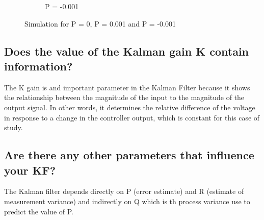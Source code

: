 \documentclass{article}
\begin{document}
\begin{figure}
\begin{subfigure} {.3\textwidth}
            \caption{P = -0.001}
        \end{subfigure}
        \caption{Simulation for P = 0, P =  0.001 and P = -0.001}
        \label{fig:simulation7}
    \end{figure}
    

    \subsection{Does the value of the Kalman gain K contain information?}

    The K gain is and important parameter in the Kalman Filter because it shows the relationship
    between the magnitude of the input to the magnitude of the output signal. In other words, it determines
    the relative difference of the voltage in response to a change in the controller output, which is constant 
    for this case of study.

    \subsection{Are there any other parameters that influence your KF?}

    The Kalman filter depends directly on P (error estimate) and R (estimate of measurement variance) and indirectly
    on Q which is th process variance use to predict the value of P.

    
    
    \nocite{*}
\end{document}
